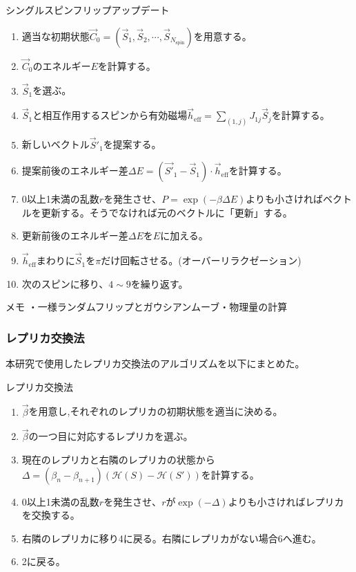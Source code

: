 \documentclass[12pt,titlepage,dvipdfmx]{jarticle}
\begin{document}
\begin{itembox}[1]{シングルスピンフリップアップデート}
   \begin{enumerate}
       \item 適当な初期状態$\vec{C}_0=(\vec{S}_1,\vec{S}_2,\cdots,\vec{S}_{N_{\mathrm{spin}}})$を用意する。
       \item $\vec{C}_0$のエネルギー$E$を計算する。
       \item $\vec{S}_1$を選ぶ。
       \item $\vec{S}_1$と相互作用するスピンから有効磁場$\vec{h}_{\mathrm{eff}} = \sum _{(1,j)}J_{1j}\vec{S}_j$を計算する。
       \item 新しいベクトル$\vec{S}'_1$を提案する。
       \item 提案前後のエネルギー差$\Delta E = (\vec{S'}_1 - \vec{S}_1) \cdot \vec{h}_{\mathrm{eff}}$を計算する。
       \item 0以上1未満の乱数$r$を発生させ、$P = \exp(-\beta \Delta E)$よりも小さければベクトルを更新する。そうでなければ元のベクトルに「更新」する。
       \item 更新前後のエネルギー差$\Delta E$を$E$に加える。
       \item $\vec{h}_{\mathrm{eff}}$まわりに$\vec{S}_1$を$\pi$だけ回転させる。(オーバーリラクゼーション)
       \item 次のスピンに移り、$4\sim9$を繰り返す。
   \end{enumerate}
\end{itembox}

メモ
・一様ランダムフリップとガウシアンムーブ・物理量の計算

\newpage

\subsubsection{レプリカ交換法}

本研究で使用したレプリカ交換法のアルゴリズムを以下にまとめた。
\begin{itembox}[2]{レプリカ交換法}
\begin{enumerate}
    \item $\vec{\beta}$を用意し,それぞれのレプリカの初期状態を適当に決める。
    \item $\vec{\beta}$の一つ目に対応するレプリカを選ぶ。
    \item 現在のレプリカと右隣のレプリカの状態から$\Delta = (\beta_n - \beta_{n+1})\left(\mathcal{H}(S) - \mathcal{H}(S')\right)$を計算する。
    \item 0以上1未満の乱数$r$を発生させ、$r$が$\exp(-\Delta)$よりも小さければレプリカを交換する。
    \item 右隣のレプリカに移り4に戻る。右隣にレプリカがない場合6へ進む。
    \item 2に戻る。
\end{enumerate}
\end{itembox}
\end{document}
